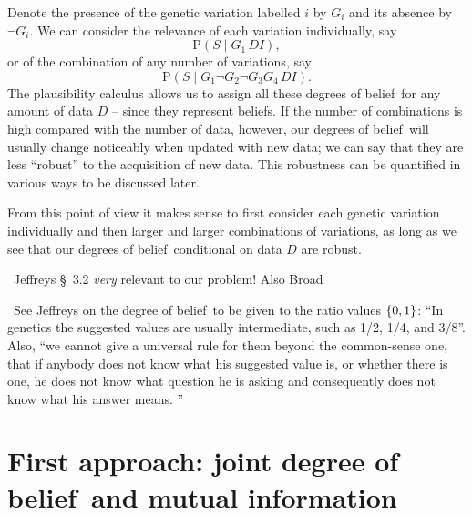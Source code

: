 \documentclass[\ifafour a4paper,12pt,\else a5paper,10pt,\fi%
onecolumn,oneside,article,%
british%
]{memoir}
\theoremstyle{remark}
\theoremstyle{innote}
\newcommand*{\citey}{\parencites*}
\DeclarePairedDelimiter\set{\{}{\}}
\newcommand*{\p}{\mathrm{P}}%
\renewcommand*{\|}{\mathpunct{|}}
\newcommand*{\sect}{\S}%
\newcommand*{\puzzle}{\maltese}
\newcommand{\mynote}[1]{ {\color{notecolour}\puzzle\ #1}}
\newcommand*{\dob}{degree of belief}
\newcommand*{\dobs}{degrees of belief}
\newcommand*{\yD}{D}
\newcommand*{\yS}{S}
\newcommand*{\yI}{I}
\newcommand*{\yGv}{G}
\begin{document}
Denote the presence of the genetic variation labelled $i$ by $\yGv_i$ and its
absence by $\lnot\yGv_i$. We can consider the  relevance of each
variation individually, say
\begin{equation}
  \label{eq:example_relevance_onevariation}
  \p(\yS \|\yGv_1 \,\yD \yI),
\end{equation}
or of the combination of any number of variations, say
\begin{equation}
  \label{eq:example_relevance_manyvariations}
  \p(\yS \|\yGv_1 \lnot\yGv_2 \lnot\yGv_3 \yGv_4 \,\yD \yI).
\end{equation}
The plausibility calculus allows us to assign all these \dobs\ for any
amount of data $\yD$ -- since they represent beliefs. If the number of
combinations is high compared with the number of data, however, our \dobs\
will usually change noticeably when updated with new data; we can say that
they are less \enquote{robust} to the acquisition of new data. This
robustness can be quantified in various ways to be discussed later.

From this point of view it makes sense to first consider each genetic
variation individually and then larger and larger combinations of
variations, as long as we see that our \dobs\ conditional on data
$\yD$ are robust.


\mynote{Jeffreys \citey{jeffreys1939_r1983} \sect~3.2 \emph{very} relevant
  to our problem! Also Broad \citey{broad1918}}

\mynote{See Jeffreys \citey[\sect~3.1, p.~124]{jeffreys1939_r1983} on the
  \dob\ to be given to the ratio values $\set{0,1}$: \enquote{In
    genetics the suggested values are usually intermediate, such as 1/2,
    1/4, and 3/8}. Also, \enquote{we cannot give a universal rule for them
    beyond the common-sense one, that if anybody does not know what his
    suggested value is, or whether there is one, he does not know what
    question he is asking and consequently does not know what his answer
    means. }}



\section{First approach: joint \dob\ and mutual information}
\label{sec:joint_prob}
\end{document}
